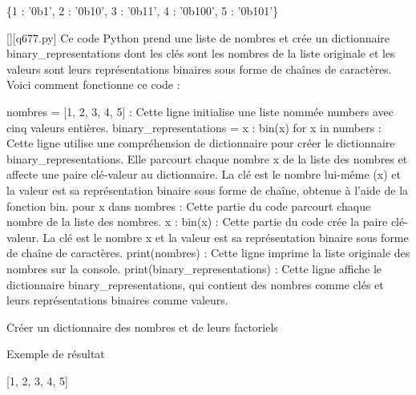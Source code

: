 \{1 : '0b1', 2 : '0b10', 3 : '0b11', 4 : '0b100', 5 : '0b101'\}
        \par
        \begin{solution}
            \renewcommand{\nomfichier}{q677.py}
            \pythonfile{\chemincode \nomfichier}[][\nomfichier]
            Ce code Python prend une liste de nombres et crée un dictionnaire binary_representations dont les clés sont les nombres de la liste originale et les valeurs sont leurs représentations binaires sous forme de chaînes de caractères. Voici comment fonctionne ce code :

    nombres = [1, 2, 3, 4, 5] : Cette ligne initialise une liste nommée numbers avec cinq valeurs entières.
    binary_representations = {x : bin(x) for x in numbers} : Cette ligne utilise une compréhension de dictionnaire pour créer le dictionnaire binary_representations. Elle parcourt chaque nombre x de la liste des nombres et affecte une paire clé-valeur au dictionnaire. La clé est le nombre lui-même (x) et la valeur est sa représentation binaire sous forme de chaîne, obtenue à l'aide de la fonction bin.
        pour x dans nombres : Cette partie du code parcourt chaque nombre de la liste des nombres.
        x : bin(x) : Cette partie du code crée la paire clé-valeur. La clé est le nombre x et la valeur est sa représentation binaire sous forme de chaîne de caractères.
    print(nombres) : Cette ligne imprime la liste originale des nombres sur la console.
    print(binary_representations) : Cette ligne affiche le dictionnaire binary_representations, qui contient des nombres comme clés et leurs représentations binaires comme valeurs.
        \end{solution}
        

        \question
        Créer un dictionnaire des nombres et de leurs factoriels

Exemple de résultat

[1, 2, 3, 4, 5]

